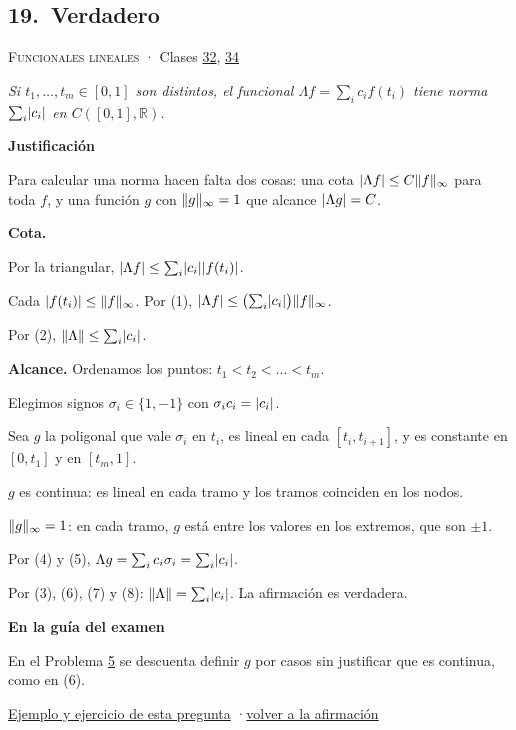 \documentclass[11pt,a4paper]{article}
\newcommand{\R}{\mathbb{R}}\newcommand{\N}{\mathbb{N}}\newcommand{\Q}{\mathbb{Q}}
\providecommand{\lt}{<}\providecommand{\gt}{>}
\newcommand{\bloque}[1]{\par\smallskip\noindent\textbf{\color{acento}#1}\par}
\begin{document}
\subsection*{\hypertarget{r-19}{}19.\ \textcolor{ok}{Verdadero}}
{\small \textsc{Funcionales lineales} · Clases \href{https://decostruttivismo.github.io/MAT2514-repaso/pdf/MAT2514_apuntes_completos.pdf\#nameddest=section.32}{32}, \href{https://decostruttivismo.github.io/MAT2514-repaso/pdf/MAT2514_apuntes_completos.pdf\#nameddest=section.34}{34}}\par
\emph{Si $t_1,\dots,t_m\in[0,1]$ son distintos, el funcional $\Lambda f=\sum_ic_if(t_i)$ tiene norma $\sum_i\lvert c_i\rvert$ en $C([0,1],\R)$.}
\bloque{Justificación}
\begin{pasos}
\item[] Para calcular una norma hacen falta dos cosas: una cota $\lvert \Lambda f\rvert\le C\lVert f\rVert_\infty$ para toda $f$, y una función $g$ con $\lVert g\rVert_\infty=1$ que alcance $\lvert \Lambda g\rvert=C$.
\item[] \textbf{Cota.}
\item[(1)] Por la triangular, $\lvert \Lambda f\rvert\le\sum_i\lvert c_i\rvert\lvert f(t_i)\rvert$.
\item[(2)] Cada $\lvert f(t_i)\rvert\le\lVert f\rVert_\infty$. Por (1), $\lvert \Lambda f\rvert\le\bigl(\sum_i\lvert c_i\rvert\bigr)\lVert f\rVert_\infty$.
\item[(3)] Por (2), $\lVert \Lambda\rVert\le\sum_i\lvert c_i\rvert$.
\item[] \textbf{Alcance.} Ordenamos los puntos: $t_1\lt t_2\lt \dots\lt t_m$.
\item[(4)] Elegimos signos $\sigma_i\in\{1,-1\}$ con $\sigma_ic_i=\lvert c_i\rvert$.
\item[(5)] Sea $g$ la poligonal que vale $\sigma_i$ en $t_i$, es lineal en cada $[t_i,t_{i+1}]$, y es constante en $[0,t_1]$ y en $[t_m,1]$.
\item[(6)] $g$ es continua: es lineal en cada tramo y los tramos coinciden en los nodos.
\item[(7)] $\lVert g\rVert_\infty=1$: en cada tramo, $g$ está entre los valores en los extremos, que son $\pm1$.
\item[(8)] Por (4) y (5), $\Lambda g=\sum_ic_i\sigma_i=\sum_i\lvert c_i\rvert$.
\item[] Por (3), (6), (7) y (8): $\lVert \Lambda\rVert=\sum_i\lvert c_i\rvert$. La afirmación es verdadera.
\end{pasos}
\bloque{En la guía del examen}
\begin{pasos}
\item[] En el Problema \hyperlink{prob-5}{5} se descuenta definir $g$ \guillemotleft{}por casos\guillemotright{} sin justificar que es continua, como en (6).
\end{pasos}
\par{}
\par{\small \hyperlink{e-19}{Ejemplo y ejercicio de esta pregunta} \quad·\quad \hyperlink{q-19}{volver a la afirmación}}
\end{document}
